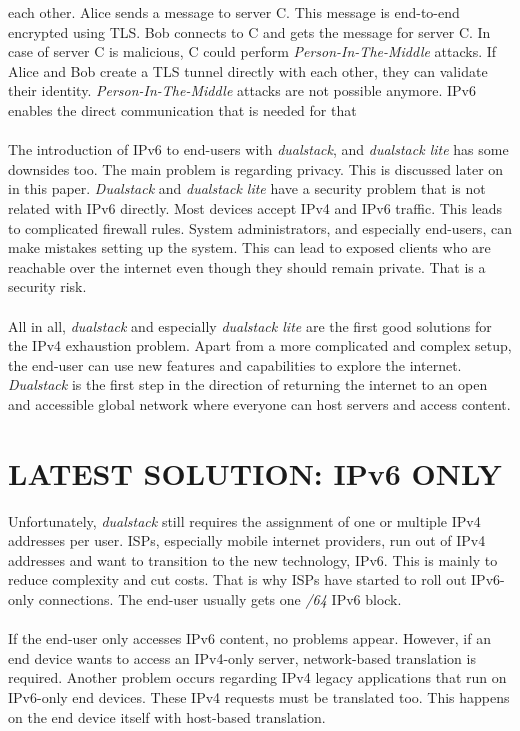 \documentclass[format=sigconf, natbib=true, nonacm=true]{acmart}
\begin{document}
each other. Alice sends a message to server C. This message is end-to-end encrypted using TLS. Bob connects to C and gets the message for server C. In case of server C is malicious, C could perform \textit{Person-In-The-Middle} attacks. If Alice and Bob create a TLS tunnel directly with each other, they can validate their identity. \textit{Person-In-The-Middle} attacks are not possible anymore. IPv6 enables the direct communication that is needed for that\\\\The introduction of IPv6 to end-users with \textit{dualstack}, and \textit{dualstack lite} has some downsides too. The main problem is regarding privacy. This is discussed later on in this paper. \textit{Dualstack} and \textit{dualstack lite} have a security problem that is not related with IPv6 directly. Most devices accept IPv4 and IPv6 traffic. This leads to complicated firewall rules. System administrators, and especially end-users, can make mistakes setting up the system. This can lead to exposed clients who are reachable over the internet even though they should remain private. That is a security risk.\\\\All in all, \textit{dualstack} and especially \textit{dualstack lite} are the first good solutions for the IPv4 exhaustion problem. Apart from a more complicated and complex setup, the end-user can use new features and capabilities to explore the internet. \textit{Dualstack} is the first step in the direction of returning the internet to an open and accessible global network where everyone can host servers and access content.
    \section{LATEST SOLUTION: IPv6 ONLY}
    Unfortunately, \textit{dualstack} still requires the assignment of one or multiple IPv4 addresses per user. ISPs, especially mobile internet providers, run out of IPv4 addresses and want to transition to the new technology, IPv6. This is mainly to reduce complexity and cut costs. That is why ISPs have started to roll out IPv6-only connections. The end-user usually gets one \textit{/64} IPv6 block.\\\\If the end-user only accesses IPv6 content, no problems appear. However, if an end device wants to access an IPv4-only server, network-based translation is required. Another problem occurs regarding IPv4 legacy applications that run on IPv6-only end devices. These IPv4 requests must be translated too. This happens on the end device itself with host-based translation.
\end{document}
